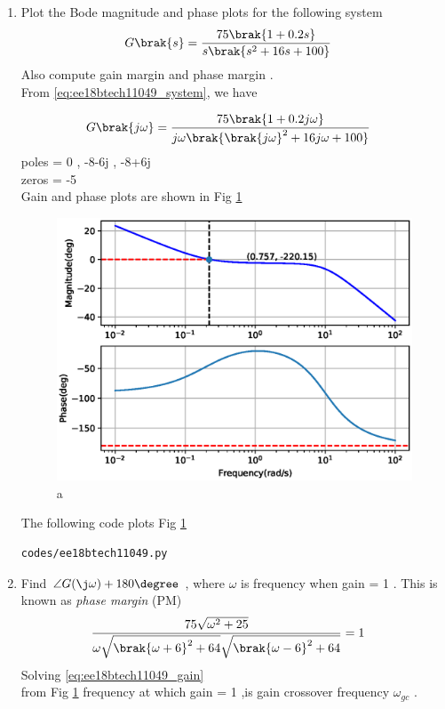 \begin{enumerate}[label=\thesection.\arabic*.,ref=\thesection.\theenumi]

\item Plot the Bode magnitude and phase plots for the following system
\begin{align}
G\brak{s} &= \frac{75\brak{1+0.2s}}{s\brak{s^2+16s+100}}
\label{eq:ee18btech11049_system}
\end{align}
Also compute gain margin and phase margin .
\\
\solution From  \eqref{eq:ee18btech11049_system}, we have 

\begin{align}
G\brak{j\omega}&=\frac{75\brak{1+0.2j\omega}}{j\omega\brak{\brak{j\omega}^2 + 16j\omega+100} }
\end{align}
poles = 0 , -8-6j , -8+6j\\
zeros = -5\\
Gain and phase plots are shown in Fig  \ref{fig:ee18btech11049} 
\begin{figure}[!h]
\centering
  \includegraphics[width=\columnwidth]{./figs/ee18btech11049.eps}
  \caption{a}
  \label{fig:ee18btech11049}
\end{figure}

The following code plots Fig \ref{fig:ee18btech11049} 

\begin{lstlisting}
codes/ee18btech11049.py
\end{lstlisting}

\item Find $\angle G(\j\omega) + 180\degree$ , where $\omega$ is frequency when gain = 1 . This is known as  {\em phase margin} (PM)
\\
\solution
\begin{align}
    \frac{75\sqrt{\omega^2 + 25}}{\omega\sqrt{\brak{\omega+6}^2+64}\sqrt{\brak{\omega-6}^2+64}} &= 1
\label{eq:ee18btech11049_gain}
\end{align}{}
Solving \eqref{eq:ee18btech11049_gain} \\ from Fig \ref{fig:ee18btech11049} frequency at which gain = 1 ,is gain crossover frequency $\omega_{gc}$ .


\end{enumerate}
